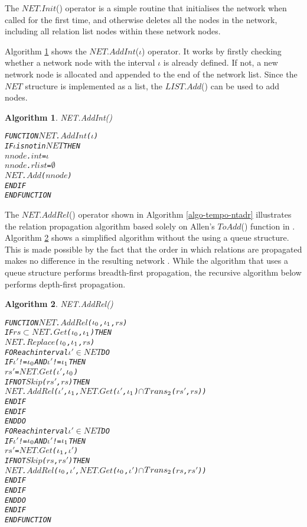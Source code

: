 \documentclass[11pt]{report}
\newenvironment{vverbatim}
{
  \begin{alltt}
}
{
    \vspace{-\baselineskip}
  \end{alltt}
}
\newtheorem{vvalgorithm}{Algorithm}[chapter]
\newenvironment{valgorithm}[2]
{
  \begin{vvalgorithm}{#1}
    \label{#2}
    \small
    \begin{vverbatim}
}
{
    \end{vverbatim}
  \end{vvalgorithm}
}
\begin{document}
        The $NET$.$Init$() operator is a simple routine that initialises the
        network when called for the first time, and otherwise deletes all the
        nodes in the network, including all relation list nodes within these
        network nodes.

        Algorithm \ref{algo-impln-ntadi} shows the $NET$.$AddInt$($\iota$)
        operator. It works by firstly checking whether a network node with the
        interval $\iota$ is already defined. If not, a new network node is
        allocated and appended to the end of the network list. Since the $NET$
        structure is implemented as a list, the $LIST$.$Add$() can be used to
        add nodes.

        \begin{valgorithm}{NET.AddInt()}{algo-impln-ntadi}
FUNCTION \(NET\).\(AddInt\)(\(\iota\))
  IF \(\iota\) is not in \(NET\) THEN
    \(nnode\).\(int\) = \(\iota\)
    \(nnode\).\(rlist\) = \(\emptyset\)
    \(NET\).\(Add\)(\(nnode\))
  ENDIF
ENDFUNCTION
        \end{valgorithm}

        The $NET$.$AddRel$() operator shown in Algorithm \ref{algo-tempo-ntadr}
        illustrates the relation propagation algorithm based solely on Allen's
        $ToAdd$() function in \cite{ALE}. Algorithm \ref{algo-impln-ntadr}
        shows a simplified algorithm without the using a queue structure. This
        is made possible by the fact that the order in which relations are
        propagated makes no difference in the resulting network \cite{MAC,VAN1}.
        While the algorithm that uses a queue structure performs breadth-first
        propagation, the recursive algorithm below performs depth-first
        propagation.

        \begin{valgorithm}{NET.AddRel()}{algo-impln-ntadr}
FUNCTION \(NET\).\(AddRel\)(\(\iota\sb{0}\), \(\iota\sb{1}\), \(rs\))
  IF \(rs\) \(\subset\) \(NET\).\(Get\)(\(\iota\sb{0}\), \(\iota\sb{1}\)) THEN
    \(NET\).\(Replace\)(\(\iota\sb{0}\), \(\iota\sb{1}\), \(rs\))
    FOR each interval \(\iota'\) \(\in\) \(NET\) DO
      IF \(\iota'\) != \(\iota\sb{0}\) AND \(\iota'\) != \(\iota\sb{1}\) THEN
        \(rs'\) =  \(NET.Get\)(\(\iota'\), \(\iota\sb{0}\))
        IF NOT \(Skip\)(\(rs'\), \(rs\)) THEN
          \(NET\).\(AddRel\)(\(\iota'\), \(\iota\sb{1}\), \(NET.Get\)(\(\iota'\), \(\iota\sb{1}\)) \(\cap\) \(Trans\sb{2}\)(\(rs'\), \(rs\)))
        ENDIF
      ENDIF
    ENDDO
    FOR each interval \(\iota'\) \(\in\) \(NET\) DO
      IF \(\iota'\) != \(\iota\sb{0}\) AND \(\iota'\) != \(\iota\sb{1}\) THEN
        \(rs'\) =  \(NET.Get\)(\(\iota\sb{1}\), \(\iota'\))
        IF NOT \(Skip\)(\(rs\), \(rs'\)) THEN
          \(NET\).\(AddRel\)(\(\iota\sb{0}\), \(\iota'\), \(NET.Get\)(\(\iota\sb{0}\), \(\iota'\)) \(\cap\) \(Trans\sb{2}\)(\(rs\), \(rs'\)))
        ENDIF
      ENDIF
    ENDDO
  ENDIF
ENDFUNCTION
          \end{valgorithm}
\end{document}
